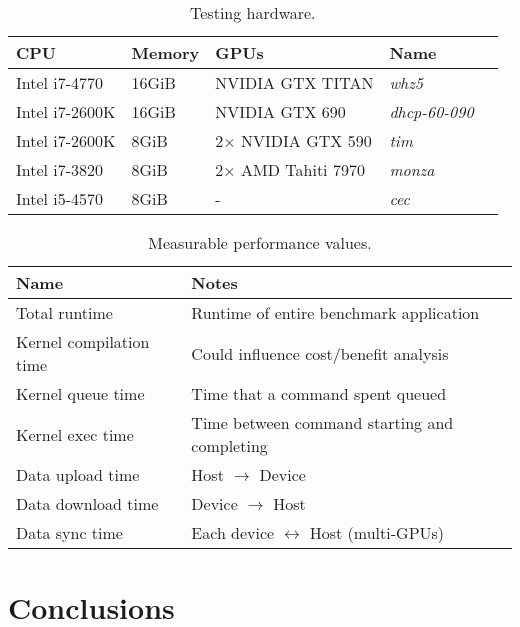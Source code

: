 \begin{table}
\footnotesize
\centering
\begin{tabular}{| l | l | l | l | l |}
\hline
\textbf{CPU} & \textbf{Memory} & \textbf{GPUs} & \textbf{Name}\\
\hline
Intel i7-4770 & 16GiB & NVIDIA GTX TITAN & \textit{whz5}\\
Intel i7-2600K & 16GiB & NVIDIA GTX 690 & \textit{dhcp-60-090}\\
Intel i7-2600K & 8GiB & 2$\times$ NVIDIA GTX 590 & \textit{tim}\\
Intel i7-3820 & 8GiB & 2$\times$ AMD Tahiti 7970 & \textit{monza}\\
Intel i5-4570 & 8GiB & - & \textit{cec}\\
\hline
\end{tabular}
\caption{Testing hardware.}
\label{tab:hw}
\end{table}

\begin{table}
\footnotesize
\centering
\begin{tabular}{| l | l |}
  \hline
  \textbf{Name} & \textbf{Notes}\\
  \hline
  Total runtime & Runtime of entire benchmark application\\
  Kernel compilation time & Could influence cost/benefit analysis\\
  Kernel queue time & Time that a command spent queued\\
  Kernel exec time & Time between command starting and completing\\
  Data upload time & Host $\rightarrow$ Device\\
  Data download time & Device $\rightarrow$ Host\\
  Data sync time & Each device $\leftrightarrow$ Host (multi-GPUs)\\
  \hline
\end{tabular}
\caption{Measurable performance values.}
\label{tab:metric}
\end{table}

\section{Conclusions}

\label{bibliography}
\printbibliography


